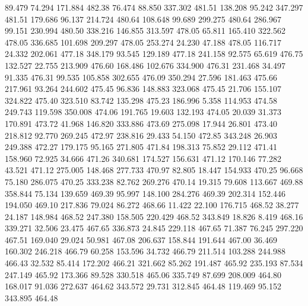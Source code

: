   89.479   74.294  171.884       482.38
  76.474   88.850  337.302       481.51
 138.208   95.242  347.297       481.51
 179.686   96.137  214.724       480.64
 108.648   99.689  299.275       480.64
 286.967   99.151  230.994       480.50
 338.216  146.855  313.597       478.05
  65.811  165.410  322.562       478.05
 336.685  101.698  209.297       478.05
 253.274   24.230   47.188       478.05
 116.717   24.332  202.061       477.18
 348.179   93.545  129.189       477.18
 241.158   92.575   65.619       476.75
 132.527   22.755  213.909       476.60
 168.486  102.676  334.900       476.31
 231.468   34.497   91.335       476.31
  99.535  105.858  302.655       476.09
 350.294   27.596  181.463       475.66
 217.961   93.264  244.602       475.45
  96.836  148.883  323.068       475.45
  21.706  155.107  324.822       475.40
 323.510   83.742  135.298       475.23
 186.996    5.358  114.953       474.58
 249.743  119.598  350.008       474.06
 191.765   19.603  132.193       474.05
  20.039   31.373  170.891       473.72
  41.968  146.820  333.886       473.69
 275.098   17.944   26.801       473.40
 218.812   92.770  269.245       472.97
 238.816   29.433   54.150       472.85
 343.248   26.903  249.388       472.27
 179.175   95.165  271.805       471.84
 198.313   75.852   29.112       471.41
 158.960   72.925   34.666       471.26
 340.681  174.527  156.631       471.12
 170.146   77.282   43.521       471.12
 275.005  148.468  277.733       470.97
  82.805   18.447  154.933       470.25
  96.668   75.180  286.075       470.25
 333.238   82.762  269.276       470.14
  19.315   79.608  113.667       469.88
 358.844   75.134  139.659       469.39
  95.997  148.100  284.276       469.39
 202.314  152.446  194.050       469.10
 217.836   79.024   86.272       468.66
  11.422   22.100  176.715       468.52
  38.277   24.187  148.984       468.52
 247.380  158.505  220.429       468.52
 343.849   18.826    8.419       468.16
 339.271   32.506   23.475       467.65
 336.873   24.845  229.118       467.65
  71.387   76.245  297.220       467.51
 169.040   29.024   50.981       467.08
 206.637  158.844  191.644       467.00
  36.469  160.302  246.218       466.79
  60.258  153.596   34.732       466.79
 211.514  103.288  244.988       466.43
  32.532   85.414  172.202       466.21
 321.662   85.262  191.487       465.92
 235.193   87.534  247.149       465.92
 173.366   89.528  330.518       465.06
 335.749   87.699  208.009       464.80
 168.017   91.036  272.637       464.62
 343.572   29.731  312.845       464.48
 119.469   95.152  343.895       464.48
